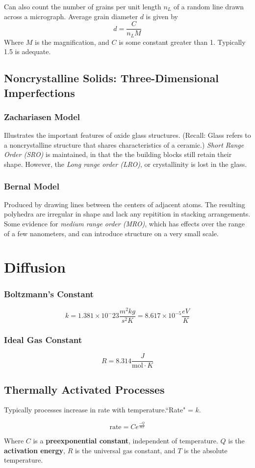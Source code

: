 \documentclass[10pt,letterpaper]{article}
\begin{document}
	Can also count the number of grains per unit length $n_L$ of a random line drawn across a micrograph. Average grain diameter $d$ is given by 
	$$
	d = \frac{C}{n_LM}
	$$
	Where $M$ is the magnification, and $C$ is some constant greater than 1. Typically 1.5 is adequate.
	\subsection{Noncrystalline Solids: Three-Dimensional Imperfections}
	\subsubsection{Zachariasen Model}
	Illustrates the important features of oxide glass structures. (Recall: Glass refers to a noncrystalline structure that shares characteristics of a ceramic.) \textit{Short Range Order (SRO)} is maintained, in that the the building blocks still retain their shape.  However, the \textit{Long range order (LRO)}, or crystallinity is lost in the glass.  
	
	\subsubsection{Bernal Model}
	Produced by drawing lines between the centers of adjacent atoms.  The resulting polyhedra are irregular in shape and lack any repitition in stacking arrangements. Some evidence for \textit{medium range order (MRO)}, which has effects over the range of a few nanometers, and can introduce structure on a very small scale. 
	
	\section{Diffusion}
	\subsubsection*{Boltzmann's Constant}
	$$
	k = 1.381 \times 10^-23 \frac{m^2 kg}{s^2 K} = 8.617 \times 10 ^{-5} \frac{eV}{K}
	$$
	\subsubsection*{Ideal Gas Constant}
	$$
	R = 8.314 \frac{J}{\text{mol} \cdot K}
	$$
	
	\subsection{Thermally Activated Processes}
	Typically processes increase in rate with temperature.``Rate" = $k$. 
	\begin{large}
		$$\text{rate} = Ce^{\frac{-Q}{RT}}$$
	\end{large}
	Where $C$ is a \textbf{preexponential constant}, independent of temperature.  $Q$ is the \textbf{activation energy}, $R$ is the universal gas constant, and $T$ is the absolute temperature.
	
\end{document}
